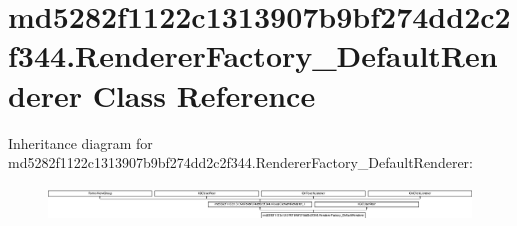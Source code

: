 \hypertarget{classmd5282f1122c1313907b9bf274dd2c2f344_1_1RendererFactory__DefaultRenderer}{}\section{md5282f1122c1313907b9bf274dd2c2f344.\+Renderer\+Factory\+\_\+\+Default\+Renderer Class Reference}
\label{classmd5282f1122c1313907b9bf274dd2c2f344_1_1RendererFactory__DefaultRenderer}
Inheritance diagram for md5282f1122c1313907b9bf274dd2c2f344.\+Renderer\+Factory\+\_\+\+Default\+Renderer\+:\begin{figure}[H]
\begin{center}
\leavevmode
\includegraphics[height=0.915033cm]{classmd5282f1122c1313907b9bf274dd2c2f344_1_1RendererFactory__DefaultRenderer}
\end{center}
\end{figure}
